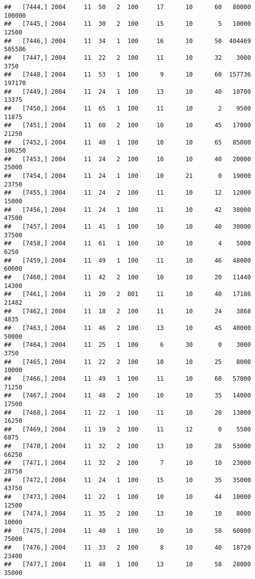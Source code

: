 \documentclass{article}\usepackage[]{graphicx}\usepackage[]{color}
\makeatletter
\newenvironment{kframe}{%
 \def\at@end@of@kframe{}%
 \ifinner\ifhmode%
  \def\at@end@of@kframe{\end{minipage}}%
  \begin{minipage}{\columnwidth}%
 \fi\fi%
 \def\FrameCommand##1{\hskip\@totalleftmargin \hskip-\fboxsep
 \colorbox{shadecolor}{##1}\hskip-\fboxsep
     \hskip-\linewidth \hskip-\@totalleftmargin \hskip\columnwidth}%
 \MakeFramed {\advance\hsize-\width
   \@totalleftmargin\z@ \linewidth\hsize
   \@setminipage}}%
 {\par\unskip\endMakeFramed%
 \at@end@of@kframe}
\newenvironment{knitrout}{}{} %
\makeatother
\begin{document}
\begin{knitrout}
\begin{kframe}
\begin{verbatim}
##   [7444,] 2004     11  50   2  100     17      10      60   80000  100000
##   [7445,] 2004     11  30   2  100     15      10       5   10000   12500
##   [7446,] 2004     11  34   1  100     16      10      50  404469  505586
##   [7447,] 2004     11  22   2  100     11      10      32    3000    3750
##   [7448,] 2004     11  53   1  100      9      10      60  157736  197170
##   [7449,] 2004     11  24   1  100     13      10      40   10700   13375
##   [7450,] 2004     11  65   1  100     11      10       2    9500   11875
##   [7451,] 2004     11  60   2  100     10      10      45   17000   21250
##   [7452,] 2004     11  40   1  100     10      10      65   85000  106250
##   [7453,] 2004     11  24   2  100     10      10      40   20000   25000
##   [7454,] 2004     11  24   1  100     10      21       0   19000   23750
##   [7455,] 2004     11  24   2  100     11      10      12   12000   15000
##   [7456,] 2004     11  24   1  100     11      10      42   38000   47500
##   [7457,] 2004     11  41   1  100     10      10      40   30000   37500
##   [7458,] 2004     11  61   1  100     10      10       4    5000    6250
##   [7459,] 2004     11  49   1  100     11      10      46   48000   60000
##   [7460,] 2004     11  42   2  100     10      10      20   11440   14300
##   [7461,] 2004     11  20   2  801     11      10      40   17186   21482
##   [7462,] 2004     11  18   2  100     11      10      24    3868    4835
##   [7463,] 2004     11  46   2  100     13      10      45   40000   50000
##   [7464,] 2004     11  25   1  100      6      30       0    3000    3750
##   [7465,] 2004     11  22   2  100     10      10      25    8000   10000
##   [7466,] 2004     11  49   1  100     11      10      60   57000   71250
##   [7467,] 2004     11  48   2  100     10      10      35   14000   17500
##   [7468,] 2004     11  22   1  100     11      10      20   13000   16250
##   [7469,] 2004     11  19   2  100     11      12       0    5500    6875
##   [7470,] 2004     11  32   2  100     13      10      28   53000   66250
##   [7471,] 2004     11  32   2  100      7      10      10   23000   28750
##   [7472,] 2004     11  24   1  100     15      10      35   35000   43750
##   [7473,] 2004     11  22   1  100     10      10      44   10000   12500
##   [7474,] 2004     11  35   2  100     13      10      10    8000   10000
##   [7475,] 2004     11  40   1  100     10      10      50   60000   75000
##   [7476,] 2004     11  33   2  100      8      10      40   18720   23400
##   [7477,] 2004     11  48   1  100     13      10      58   28000   35000

\end{verbatim}
\end{kframe}
\end{knitrout}
\end{document}
